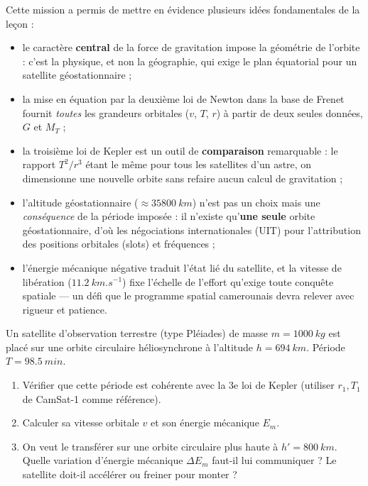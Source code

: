 \documentclass[11pt]{article}
\newcounter{popsec}
\newcounter{popsub}
\newcommand{\courssub}[1]{%
  \stepcounter{popsub}%
  \par\vspace{9pt}\noindent{\popxbold\fontsize{11.5}{13}\selectfont\color{popink}{\color{poporange}\thepopsec.\thepopsub}\hspace{6pt}#1}\par\nopagebreak\vspace{4pt}
}
\begin{document}
\courssub{Bilan de l'activité}

Cette mission a permis de mettre en évidence plusieurs idées fondamentales de la leçon :
\begin{itemize}
\item le caractère \textbf{central} de la force de gravitation impose la géométrie de l'orbite : c'est la physique, et non la géographie, qui exige le plan équatorial pour un satellite géostationnaire ;
\item la mise en équation par la deuxième loi de Newton dans la base de Frenet fournit \emph{toutes} les grandeurs orbitales ($v$, $T$, $r$) à partir de deux seules données, $G$ et $M_T$ ;
\item la troisième loi de Kepler est un outil de \textbf{comparaison} remarquable : le rapport $T^2/r^3$ étant le même pour tous les satellites d'un astre, on dimensionne une nouvelle orbite sans refaire aucun calcul de gravitation ;
\item l'altitude géostationnaire ($\approx \SI{35800}{km}$) n'est pas un choix mais une \emph{conséquence} de la période imposée : il n'existe qu'\textbf{une seule} orbite géostationnaire, d'où les négociations internationales (UIT) pour l'attribution des positions orbitales (slots) et fréquences ;
\item l'énergie mécanique négative traduit l'état lié du satellite, et la vitesse de libération ($\SI{11,2}{km.s^{-1}}$) fixe l'échelle de l'effort qu'exige toute conquête spatiale — un défi que le programme spatial camerounais devra relever avec rigueur et patience.
\end{itemize}

\begin{exercice}
Un satellite d'observation terrestre (type Pléiades) de masse $m = \SI{1000}{kg}$ est placé sur une orbite circulaire héliosynchrone à l'altitude $h = \SI{694}{km}$. Période $T = \SI{98,5}{min}$.
\begin{enumerate}
\item Vérifier que cette période est cohérente avec la 3e loi de Kepler (utiliser $r_1, T_1$ de CamSat-1 comme référence).
\item Calculer sa vitesse orbitale $v$ et son énergie mécanique $E_m$.
\item On veut le transférer sur une orbite circulaire plus haute à $h' = \SI{800}{km}$. Quelle variation d'énergie mécanique $\Delta E_m$ faut-il lui communiquer ? Le satellite doit-il accélérer ou freiner pour monter ?
\end{enumerate}
\end{exercice}
\end{document}
